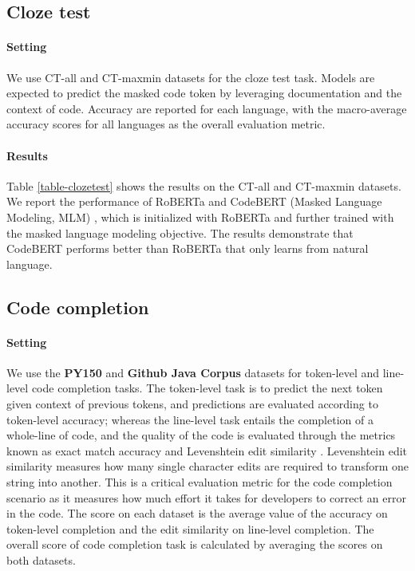 \documentclass[sigconf,nonacm,screen]{acmart}
\begin{document}
\subsection{Cloze test}
\paragraph{Setting} 
We use CT-all and CT-maxmin datasets for the cloze test task. Models are expected to predict the masked code token by leveraging documentation and the context of code.
Accuracy are reported for each language, with  the macro-average accuracy scores for all languages as the overall evaluation metric.

\paragraph{Results} Table \ref{table-clozetest} shows the results on the CT-all and CT-maxmin datasets. We report the performance of RoBERTa \cite{liu2019roberta} and CodeBERT (Masked Language Modeling, MLM) \cite{feng2020codebert}, which is initialized with RoBERTa and further trained with the masked language modeling objective. 
The results demonstrate that CodeBERT performs better than RoBERTa that only learns from natural language.



\subsection{Code completion}
\paragraph{Setting} 
We use the \textbf{PY150} and  \textbf{Github Java Corpus} datasets for token-level and line-level code completion tasks. The token-level task is to predict the next token given context of previous tokens, and predictions are evaluated according to token-level accuracy; whereas the line-level task entails the completion of a whole-line of code, and the quality of the code is evaluated through the metrics known as
exact match accuracy and Levenshtein edit similarity \cite{svyatkovskiy2020intellicode}. Levenshtein edit similarity measures how many single character edits are required to transform one string into another. This is a critical evaluation metric for the code completion scenario as it measures how much effort it takes for developers to correct an error in the code.
The score on each dataset is the average value of the accuracy on token-level completion and the edit similarity on line-level completion. The overall score of code completion task is calculated by averaging the scores on both datasets.
\end{document}
